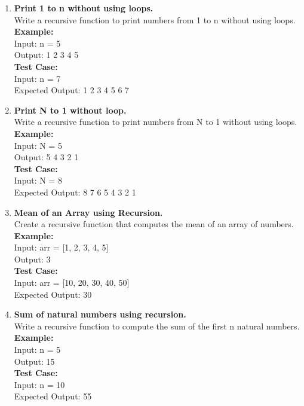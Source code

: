 \documentclass[12pt]{article}
\begin{document}
\begin{enumerate}

    \item \textbf{Print 1 to n without using loops.} \\
    Write a recursive function to print numbers from 1 to n without using loops. \\
    \textbf{Example:} \\
    Input: n = 5 \\
    Output: 1 2 3 4 5 \\
    \textbf{Test Case:} \\
    Input: n = 7 \\
    Expected Output: 1 2 3 4 5 6 7
    
    \item \textbf{Print N to 1 without loop.} \\
    Write a recursive function to print numbers from N to 1 without using loops. \\
    \textbf{Example:} \\
    Input: N = 5 \\
    Output: 5 4 3 2 1 \\
    \textbf{Test Case:} \\
    Input: N = 8 \\
    Expected Output: 8 7 6 5 4 3 2 1
    
    \item \textbf{Mean of an Array using Recursion.} \\
    Create a recursive function that computes the mean of an array of numbers. \\
    \textbf{Example:} \\
    Input: arr = [1, 2, 3, 4, 5] \\
    Output: 3 \\
    \textbf{Test Case:} \\
    Input: arr = [10, 20, 30, 40, 50] \\
    Expected Output: 30
    
    \item \textbf{Sum of natural numbers using recursion.} \\
    Write a recursive function to compute the sum of the first n natural numbers. \\
    \textbf{Example:} \\
    Input: n = 5 \\
    Output: 15 \\
    \textbf{Test Case:} \\
    Input: n = 10 \\
    Expected Output: 55
    

\end{enumerate}
\end{document}
